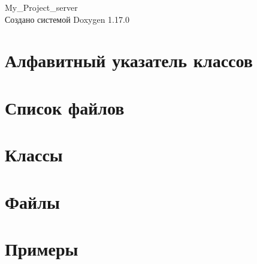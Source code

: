 \documentclass[twoside]{book}
\newcommand{\+}{\discretionary{\mbox{\scriptsize$\hookleftarrow$}}{}{}}
\newcommand{\clearemptydoublepage}{%
    \newpage{\pagestyle{empty}\cleardoublepage}%
  }
\begin{document}
  \raggedbottom
    \hypersetup{pageanchor=false,
                bookmarksnumbered=true,
                pdfencoding=unicode
               }
  \begin{titlepage}
  \vspace*{7cm}
  \begin{center}%
  {\Large My\+\_\+\+Project\+\_\+server}\\
  \vspace*{1cm}
  {\large Создано системой Doxygen 1.17.0}\\
  \end{center}
  \end{titlepage}
  \clearemptydoublepage
  \tableofcontents
  \clearemptydoublepage
  \hypersetup{pageanchor=true}

\chapter{Алфавитный указатель классов}

\chapter{Список файлов}

\chapter{Классы}



\chapter{Файлы}







\chapter{Примеры}

  \backmatter
  \newpage
  \clearemptydoublepage
  \printindex
\end{document}
